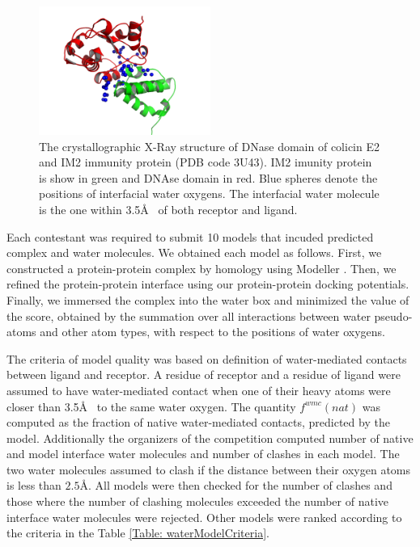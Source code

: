 \begin{figure}[H]
\begin{center}
\includegraphics[width=0.5\textwidth]{Scoring/Fig/T47Water.png}
\caption[The crystallographic X-Ray structure of DNase domain of colicin E2 and IM2 immunity protein]{
The crystallographic X-Ray structure of DNase domain of colicin E2 and IM2 immunity protein (PDB code 3U43). IM2 imunity protein is show in green and DNAse domain in red.
Blue spheres denote the positions of interfacial water oxygens. The interfacial water molecule is the one within 3.5\AA~ of both receptor and ligand.}
\label{fig:T47XrayStructure} 
\end{center}
\end{figure}

Each contestant was required to submit 10 models that incuded predicted complex and water molecules. We obtained each model as follows. 
First, we constructed a protein-protein complex by homology using Modeller \cite{eswar2006comparative}. 
Then, we refined the protein-protein interface using our protein-protein docking potentials. 
Finally, we immersed the complex into the water box and minimized the value of the score, obtained by the summation over all interactions between water pseudo-atoms and other atom types,
with respect to the positions of water oxygens.

The criteria  of model quality was based on definition of water-mediated contacts between ligand and receptor. A residue of receptor and a residue of ligand were assumed to
have water-mediated contact when one of their heavy atoms were closer than 3.5\AA~ to the same water oxygen. The quantity $f^{wmc}(nat)$ was computed as the fraction of 
native water-mediated contacts, predicted by the model. Additionally the organizers of the competition computed number of native and model interface water molecules and
number of clashes in each model. The two water molecules assumed to clash if the distance between their oxygen atoms is less than $2.5$\AA. All models were then checked 
for the number of clashes and those where the number of clashing molecules exceeded the number of native interface water molecules were rejected. Other models were
ranked according to the criteria in the Table \ref{Table: waterModelCriteria}.

